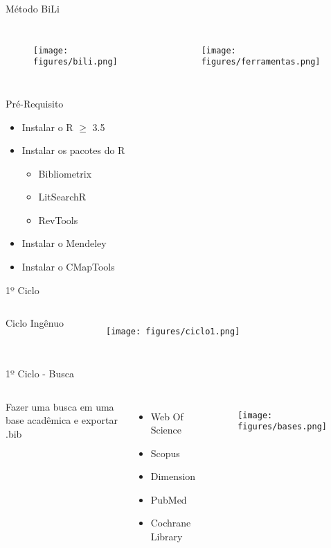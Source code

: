 \begin{frame}{Método BiLi}
	\begin{columns}
        \begin{figure}[!hb]
            \texttt{[image: figures/bili.png]}
        \end{figure}
		\begin{figure}[hb]
            \texttt{[image: figures/ferramentas.png]}
		\end{figure}
	\end{columns}
\end{frame}

\begin{frame}{Pré-Requisito}
	\begin{itemize}
		\item Instalar o R $\geq$ 3.5
		\item Instalar os pacotes do R
		\begin{itemize}
			\item Bibliometrix
			\item LitSearchR
			\item RevTools
		\end{itemize}
		\item Instalar o Mendeley
		\item Instalar o CMapTools
	\end{itemize}
\end{frame}

\begin{frame}{1º Ciclo}

	\begin{columns}
		\column{.5\textwidth}
        Ciclo Ingênuo
		\column{.5\textwidth}
		\begin{figure}[hb]
            \texttt{[image: figures/ciclo1.png]}
		\end{figure}
	\end{columns}
\end{frame}

\begin{frame}{1º Ciclo - Busca}
	\begin{columns}
		\column{.4\textwidth}
        Fazer uma busca em uma base acadêmica e exportar .bib
        \begin{itemize}
            \item Web Of Science
            \item Scopus
            \item Dimension
            \item PubMed
            \item Cochrane Library
        \end{itemize}
		\column{.6\textwidth}
		\begin{figure}[hb]
            \texttt{[image: figures/bases.png]}
		\end{figure}
	\end{columns}
\end{frame}

